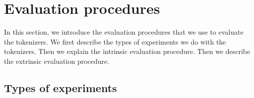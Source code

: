 





\section{Evaluation procedures}

In this section, we introduce the evaluation procedures that we use to evaluate the tokenizers. We first describe the types of experiments we do with the tokenizers. Then we explain the intrinsic evaluation procedure. Then we describe the extrinsic evaluation procedure.

\subsection{Types of experiments}

